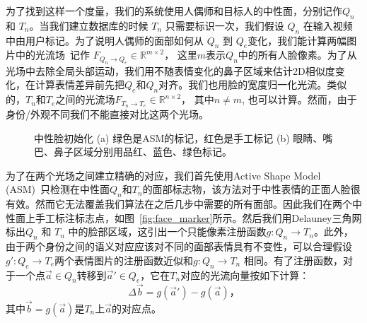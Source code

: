 为了找到这样一个度量，我们的系统使用人偶师和目标人的中性面，分别记作$Q_n$ 和 $T_n$。当我们建立数据库的时候 $T_n$ 只需要标识一次，我们假设 $Q_n$ 在输入视频中由用户标记。为了说明人偶师的面部如何从 $Q_n$ 到 $Q_e$变化，我们能计算两幅图片中的光流场~\cite{celiu}记作 \mbox{\boldmath $F$}$_{Q_n \to Q_e}\in\mathbb{R}^{m \times 2}$， 这里$m$表示$Q_n$中的所有人脸像素。为了从光场中去除全局头部运动，我们用不随表情变化的鼻子区域来估计2D相似度变化，在计算表情差异前先把$Q_e$和$Q_n$对齐。我们也用脸的宽度归一化光流。类似的，$T_n$和$T_e$之间的光流场\mbox{\boldmath $F$}$_{T_n \to T_e}\in\mathbb{R}^{n \times 2}$， 其中$n \neq m$, 也可以计算。然而，由于身份/外观不同我们不能直接对比这两个光场。
\begin{figure}[htbp]
\centering
    \hspace{5mm}
    \caption{中性脸初始化 (a) 绿色是ASM的标记，红色是手工标记
    (b) 眼睛、嘴巴、鼻子区域分别用品红、蓝色、绿色标记。}
    \label{fig:face}
\end{figure}
为了在两个光场之间建立精确的对应，我们首先使用Active Shape Model (ASM)~\cite{asm}只检测在中性面$Q_n$和$T_n$的面部标志物，该方法对于中性表情的正面人脸很有效。然而它无法覆盖我们算法在之后几步中需要的所有面部。因此我们在两个中性面上手工标注标志点，如图~\ref{fig:face_marker}所示。然后我们用Delauney三角网标出$Q_n$ 和 $T_n$ 中的脸部区域，这引出一个只能像素注册函数$g: Q_n \to T_n$。此外，由于两个身份之间的语义对应应该对不同的面部表情具有不变性，可以合理假设$g': Q_e \to T_e$两个表情图片的注册函数近似和$g: Q_n \to T_n$ 相同。有了注册函数，对于一个点$\vec{a}\in Q_n$转移到$\vec{a}' \in Q_e$，它在$T_n$对应的光流向量按如下计算：
\begin{equation}\label{eq:map2}
\Delta \vec{b}=g(\vec{a}')-g(\vec{a})，
\end{equation}
其中$\vec{b}=g(\vec{a})$是$T_n$上$\vec{a}$的对应点。

